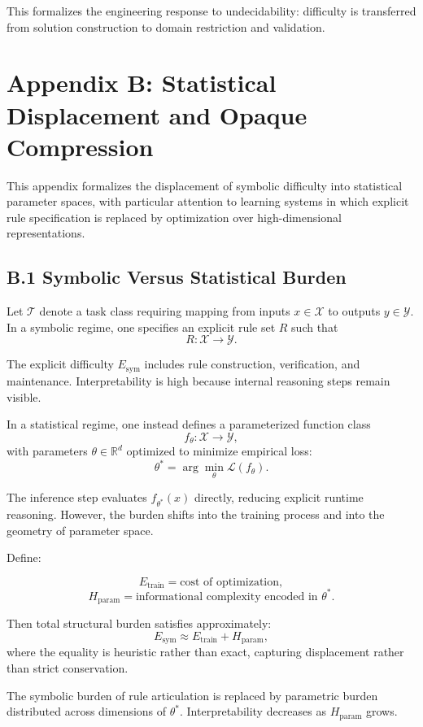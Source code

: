 \documentclass[11pt]{article}
\begin{document}
This formalizes the engineering response to undecidability: difficulty is transferred from solution construction to domain restriction and validation.

\section{Appendix B: Statistical Displacement and Opaque Compression}

This appendix formalizes the displacement of symbolic difficulty into statistical parameter spaces, with particular attention to learning systems in which explicit rule specification is replaced by optimization over high-dimensional representations.

\subsection{B.1 Symbolic Versus Statistical Burden}

Let $\mathcal{T}$ denote a task class requiring mapping from inputs $x \in \mathcal{X}$ to outputs $y \in \mathcal{Y}$. In a symbolic regime, one specifies an explicit rule set $R$ such that
\[
R : \mathcal{X} \to \mathcal{Y}.
\]

The explicit difficulty $E_{\text{sym}}$ includes rule construction, verification, and maintenance. Interpretability is high because internal reasoning steps remain visible.

In a statistical regime, one instead defines a parameterized function class
\[
f_\theta : \mathcal{X} \to \mathcal{Y},
\]
with parameters $\theta \in \mathbb{R}^d$ optimized to minimize empirical loss:
\[
\theta^* = \arg\min_{\theta} \mathcal{L}(f_\theta).
\]

The inference step evaluates $f_{\theta^*}(x)$ directly, reducing explicit runtime reasoning. However, the burden shifts into the training process and into the geometry of parameter space.

Define:

\[
E_{\text{train}} = \text{cost of optimization},
\]
\[
H_{\text{param}} = \text{informational complexity encoded in } \theta^*.
\]

Then total structural burden satisfies approximately:
\[
E_{\text{sym}} \approx E_{\text{train}} + H_{\text{param}},
\]
where the equality is heuristic rather than exact, capturing displacement rather than strict conservation.

The symbolic burden of rule articulation is replaced by parametric burden distributed across dimensions of $\theta^*$. Interpretability decreases as $H_{\text{param}}$ grows.
\end{document}
